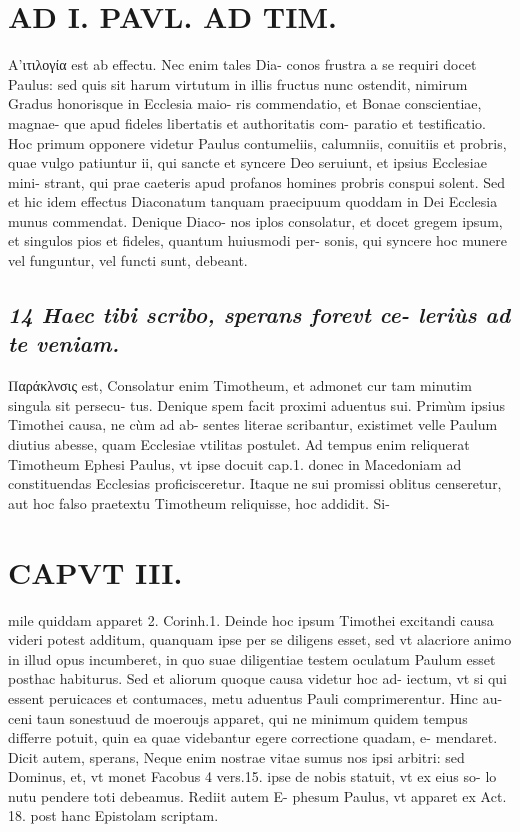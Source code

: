 \documentclass{article}
\begin{document}
\begin{pages}
\section*{AD I. PAVL. AD TIM. }
\marginpar{[ p.166 ]}\pstart Α'ιτιλογία est ab effectu. Nec enim tales Dia- conos frustra a se requiri docet Paulus: sed quis sit harum virtutum in illis fructus nunc ostendit, nimirum Gradus honorisque in Ecclesia maio- ris commendatio, et Bonae conscientiae, magnae- que apud fideles libertatis et authoritatis com- paratio et testificatio. Hoc primum opponere videtur Paulus contumeliis, calumniis, conuitiis et probris, quae vulgo patiuntur ii, qui sancte et syncere Deo seruiunt, et ipsius Ecclesiae mini- strant, qui prae caeteris apud profanos homines probris conspui solent. Sed et hic idem effectus Diaconatum tanquam praecipuum quoddam in Dei Ecclesia munus commendat. Denique Diaco- nos iplos consolatur, et docet gregem ipsum, et singulos pios et fideles, quantum huiusmodi per- sonis, qui syncere hoc munere vel funguntur, vel functi sunt, debeant.  \pend
{}
{}
\subsection*{\textit{14 Haec tibi scribo, sperans forevt ce- leriùs ad te veniam. }}\pstart Παράκλνσις est, Consolatur enim Timotheum, et admonet cur tam minutim singula sit persecu- tus. Denique spem facit proximi aduentus sui. Primùm ipsius Timothei causa, ne cùm ad ab- sentes literae scribantur, existimet velle Paulum diutius abesse, quam Ecclesiae vtilitas postulet. Ad tempus enim reliquerat Timotheum Ephesi Paulus, vt ipse docuit cap.1. donec in Macedoniam ad constituendas Ecclesias proficisceretur. Itaque  ne sui promissi oblitus censeretur, aut hoc falso praetextu Timotheum reliquisse, hoc addidit. Si-  \pend
\section*{CAPVT  III. }
\marginpar{[ p.167 ]}\pstart mile quiddam apparet 2. Corinh.1. Deinde hoc ipsum Timothei excitandi causa videri potest additum, quanquam ipse per se diligens esset, sed vt alacriore animo in illud opus incumberet, in quo suae diligentiae testem oculatum Paulum esset posthac habiturus.  \pend\pstart Sed et aliorum quoque causa videtur hoc ad- iectum, vt si qui essent peruicaces et contumaces, metu aduentus Pauli comprimerentur. Hinc au- ceni taun sonestuud de moeroujs apparet, qui ne minimum quidem tempus differre potuit, quin ea quae videbantur egere correctione quadam, e- mendaret.  \pend\pstart Dicit autem, sperans, Neque enim nostrae vitae sumus nos ipsi arbitri: sed Dominus, et, vt monet Facobus 4 vers.15. ipse de nobis statuit, vt ex eius so- lo nutu pendere toti debeamus. Rediit autem E- phesum Paulus, vt apparet ex Act. 18. post hanc Epistolam scriptam.  \pend
{}
{}

\end{pages}
\end{document}
